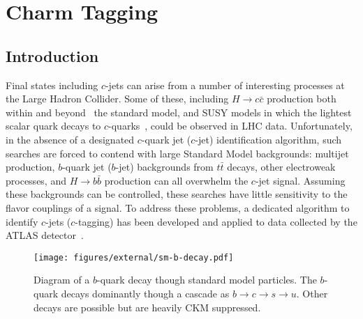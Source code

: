 \chapter{Charm Tagging}
\label{sec:tagging}

\section{Introduction}
\label{tag:sec:into}

\newcommand{\jfcplotswherefrom}{The jets are from $t \bar{t}$ simulated events generated with \textsc{powheg+pythia6}.}
\newcommand{\wherefrom}{The jets are from $t \bar{t}$ simulated events generated with \textsc{powheg+pythia6}.}

Final states including $c$-jets can arise from a number of interesting processes at the Large Hadron Collider.
Some of these, including $H \to c\bar{c}$ production both within and beyond~\cite{charminghiggs} the standard model, and SUSY models in which the lightest scalar quark decays to $c$-quarks~\cite{stoptocharm}, could be observed in LHC data.
Unfortunately, in the absence of a designated $c$-quark jet ($c$-jet) identification algorithm, such searches are forced to contend with large Standard Model backgrounds: multijet production, $b$-quark jet ($b$-jet) backgrounds from $t\bar{t}$ decays, other electroweak processes, and $H \to b\bar{b}$ production can all overwhelm the $c$-jet signal.
Assuming these backgrounds can be controlled, these searches have little sensitivity to the flavor couplings of a signal.
To address these problems, a dedicated algorithm to identify $c$-jets ($c$-tagging) has been developed and applied to data collected by the ATLAS detector~\cite{DetPap}.

\begin{figure}
  \begin{center}
\texttt{[image: figures/external/sm-b-decay.pdf]}
\caption[The decay chain of a $b$-quark]{Diagram of a $b$-quark decay though standard model particles. The $b$-quark decays dominantly though a cascade as $b \to c \to s \to u$. Other decays are possible but are heavily CKM suppressed.}
\label{fig:sm-b-decay}
  \end{center}
\end{figure}

